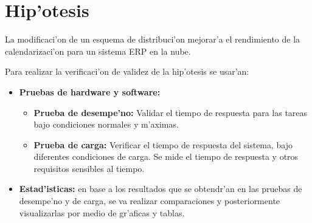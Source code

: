 \newpage

\section*{Hip'otesis}

La modificaci'on de un esquema de distribuci'on mejorar'a el rendimiento de la calendarizaci'on para un sistema ERP en la nube.

Para realizar la verificaci'on de validez de la hip'otesis se usar'an:


\begin{itemize}
	\item \textbf{Pruebas de hardware y software:}
	\begin{itemize}
	\item \textbf{Prueba de desempe'no:} Validar el tiempo de respuesta para las tareas bajo condiciones normales y m'aximas.
	\item \textbf{Prueba de carga:} Verificar el tiempo de respuesta del sistema, bajo diferentes condiciones de carga. Se mide el tiempo de respuesta y otros requisitos sensibles al tiempo.
	\end{itemize}
	\item \textbf{Estad'isticas:} en base a los resultados que se obtendr'an en las pruebas de desempe'no y de carga, se va realizar comparaciones y posteriormente visualizarlas por medio de gr'aficas y tablas.
\end{itemize}
